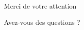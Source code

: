 \begin{frame}
	\frametitle{}
	\begin{center}
	Merci de votre attention

	\vspace{10mm}

	Avez-vous des questions ?
	\end{center}
\end{frame}
